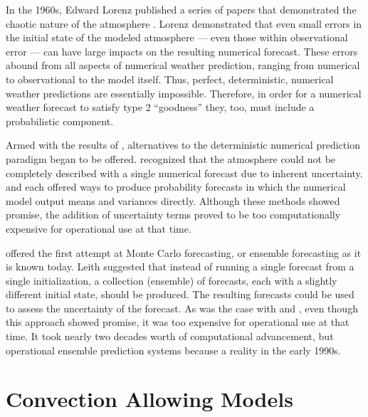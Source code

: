 In the 1960s, Edward Lorenz published a series of papers that demonstrated the chaotic nature of the atmosphere \citep{Lorenz1963, Lorenz1965, Lorenz1968}.
Lorenz demonstrated that even small errors in the initial state of the modeled atmosphere --- even those within observational error --- can have large impacts on the resulting numerical forecast.
These errors abound from all aspects of numerical weather prediction, ranging from numerical to observational to the model itself.
Thus, perfect, deterministic, numerical weather predictions are essentially impossible.
Therefore, in order for a numerical weather forecast to satisfy type 2 ``goodness'' they, too, must include a probabilistic component.


Armed with the results of \cite{Lorenz1963, Lorenz1965, Lorenz1968}, alternatives to the deterministic numerical prediction paradigm began to be offered.
\cite{Epstein1969} recognized that the atmosphere could not be completely described with a single numerical forecast due to inherent uncertainty.
\cite{Epstein1969} and \cite{Gleeson1970} each offered ways to produce probability forecasts in which the numerical model output means and variances directly.
Although these methods showed promise, the addition of uncertainty terms proved to be too computationally expensive for operational use at that time.


\cite{Leith1974} offered the first attempt at Monte Carlo forecasting, or ensemble forecasting as it is known today.
Leith suggested that instead of running a single forecast from a single initialization, a collection (ensemble) of forecasts, each with a slightly different initial state, should be produced.
The resulting forecasts could be used to assess the uncertainty of the forecast.
As was the case with \cite{Epstein1969} and \cite{Gleeson1970}, even though this approach showed promise, it was too expensive for operational use at that time.
It took nearly two decades worth of computational advancement, but operational ensemble prediction systems because a reality in the early 1990s.









\section{Convection Allowing Models}

